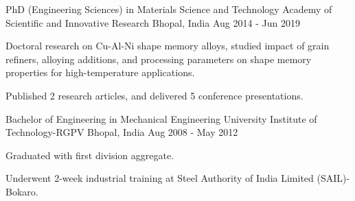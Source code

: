 

\begin{cventries}

  \cventry
    {PhD (Engineering Sciences) in Materials Science and Technology} %
    {Academy of Scientific and Innovative Research} %
    {Bhopal, India} %
    {Aug 2014 - Jun 2019} %
    {
      \begin{cvitems} %
        \item {Doctoral research on Cu-Al-Ni shape memory alloys, studied impact of grain refiners, alloying additions, and processing parameters on shape memory properties for high-temperature applications.}
        \item {Published 2 research articles, and delivered 5 conference presentations.}
      \end{cvitems}
    }
    
  \cventry
    {Bachelor of Engineering in Mechanical Engineering} %
    {University Institute of Technology-RGPV} %
    {Bhopal, India} %
    {Aug 2008 - May 2012} %
    {
      \begin{cvitems} %
        \item {Graduated with first division aggregate.}
        \item {Underwent 2-week industrial training at Steel Authority of India Limited (SAIL)-Bokaro.} 
      \end{cvitems}
    }
\end{cventries}
